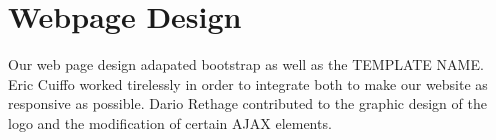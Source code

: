\chapter{Webpage Design}

Our web page design adapated bootstrap as well as the TEMPLATE NAME. Eric Cuiffo worked tirelessly in order to integrate both to make our website as responsive as possible.
Dario Rethage contributed to the graphic design of the logo and the modification of certain AJAX elements.
